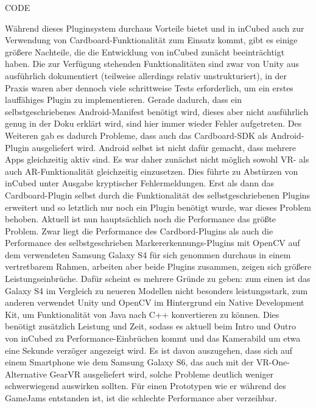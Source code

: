 CODE

Während dieses Pluginsystem durchaus Vorteile bietet und in inCubed auch zur Verwendung von Cardboard-Funktionalität zum Einsatz kommt, gibt es einige größere Nachteile, die die Entwicklung von inCubed zunächt beeinträchtigt haben. Die zur Verfügung stehenden Funktionalitäten sind zwar von Unity aus ausführlich dokumentiert (teilweise allerdings relativ unstrukturiert), in der Praxis waren aber dennoch viele schrittweise Tests erforderlich, um ein erstes lauffähiges Plugin zu implementieren. Gerade dadurch, dass ein selbstgeschriebenes Android-Manifest benötigt wird, dieses aber nicht ausführlich genug in der Doku erklärt wird, sind hier immer wieder Fehler aufgetreten. Des Weiteren gab es dadurch Probleme, dass auch das Cardboard-SDK als Android-Plugin ausgeliefert wird. Android selbst ist nicht dafür gemacht, dass mehrere Apps gleichzeitig aktiv sind. Es war daher zunächst nicht möglich sowohl VR- als auch AR-Funktionalität gleichzeitig einzusetzen. Dies führte zu Abstürzen von inCubed unter Ausgabe kryptischer Fehlermeldungen. Erst als dann das Cardboard-Plugin selbst durch die Funktionalität des selbstgeschriebenen Plugins erweitert und so letztlich nur noch ein Plugin benötigt wurde, war dieses Problem behoben. Aktuell ist nun hauptsächlich noch die Performance das größte Problem. Zwar liegt die Performance des Cardbord-Plugins als auch die Performance des selbstgeschrieben Markererkennungs-Plugins mit OpenCV auf dem verwendeten Samsung Galaxy S4 für sich genommen durchaus in einem vertretbarem Rahmen, arbeiten aber beide Plugins zusammen, zeigen sich größere Leistungseinbrüche. Dafür scheint es mehrere Gründe zu geben: zum einen ist das Galaxy S4 im Vergleich zu neueren Modellen nicht besonders leistungsstark, zum anderen verwendet Unity und OpenCV im Hintergrund ein Native Development Kit, um Funktionalität von Java nach C++ konvertieren zu können. Dies benötigt zusätzlich Leistung und Zeit, sodass es aktuell beim Intro und Outro von inCubed zu Performance-Einbrüchen kommt und das Kamerabild um etwa eine Sekunde verzöger angezeigt wird. Es ist davon auszugehen, dass sich auf einem Smartphone wie dem Samsung Galaxy S6, das auch mit der VR-One-Alternative GearVR ausgeliefert wird, solche Probleme deutlich weniger schwerwiegend auswirken sollten. Für einen Prototypen wie er während des GameJams entstanden ist, ist die schlechte Performance aber verzeihbar.
